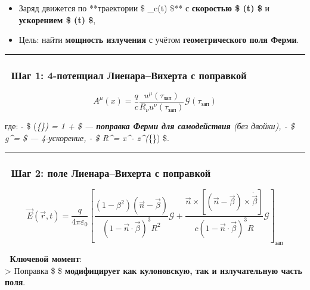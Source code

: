 \documentclass[11pt]{article}
\providecommand{\tightlist}{%
      \setlength{\itemsep}{0pt}\setlength{\parskip}{0pt}}
\begin{document}
\begin{itemize}
\tightlist
\item
  Заряд движется по **траектории \$ \_c(t) \$** с
  \textbf{скоростью \$ (t) \$} и \textbf{ускорением \$
  \vec{\Gamma}(t) \$},
\item
  Цель: найти \textbf{мощность излучения} с учётом
  \textbf{геометрического поля Ферми}.
\end{itemize}

\begin{center}\rule{0.5\linewidth}{\linethickness}\end{center}

\subsubsection{🔹 Шаг 1: 4-потенциал Лиенара--Вихерта с
поправкой}\label{ux448ux430ux433-1-4-ux43fux43eux442ux435ux43dux446ux438ux430ux43b-ux43bux438ux435ux43dux430ux440ux430ux432ux438ux445ux435ux440ux442ux430-ux441-ux43fux43eux43fux440ux430ux432ux43aux43eux439}

\[
A^\mu(x) = \frac{q}{c} \frac{u^\mu(\tau_{\text{зап}})}{R_\nu u^\nu(\tau_{\text{зап}})} \mathcal{G}(\tau_{\text{зап}})
\]

где: - \$ (\tau\emph{\{\}) = 1 +
 \$ --- \textbf{поправка Ферми для самодействия}
(без двойки), - \$ g\^{}\mu =  \$ --- 4-ускорение, -
\$ R\^{}\mu = x\^{}\mu - z\^{}\mu(\tau}\{\}) \$.

\begin{center}\rule{0.5\linewidth}{\linethickness}\end{center}

\subsubsection{🔹 Шаг 2: поле Лиенара--Вихерта с
поправкой}\label{ux448ux430ux433-2-ux43fux43eux43bux435-ux43bux438ux435ux43dux430ux440ux430ux432ux438ux445ux435ux440ux442ux430-ux441-ux43fux43eux43fux440ux430ux432ux43aux43eux439}

\[
\vec{E}(\vec{r}, t) = \frac{q}{4\pi\varepsilon_0} \left[
\frac{(1 - \beta^2)(\vec{n} - \vec{\beta})}{(1 - \vec{n} \cdot \vec{\beta})^3 R^2} \mathcal{G}
+ \frac{\vec{n} \times \left[ (\vec{n} - \vec{\beta}) \times \dot{\vec{\beta}} \right]}{c (1 - \vec{n} \cdot \vec{\beta})^3 R} \mathcal{G}
\right]_{\text{зап}}
\]

📌 \textbf{Ключевой момент}:\\
\textgreater{} Поправка \$  \$ \textbf{модифицирует как
кулоновскую, так и излучательную часть поля}.
\end{document}
